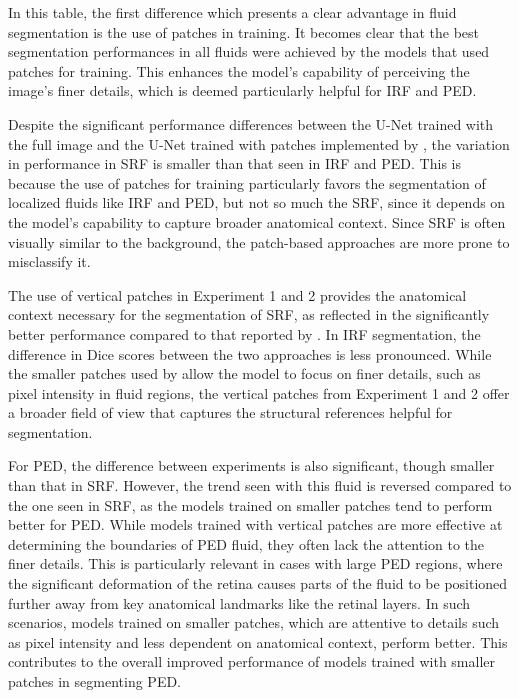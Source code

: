 In this table, the first difference which presents a clear advantage in fluid segmentation is the use of patches in training. It becomes clear that the best segmentation performances in all fluids were achieved by the models that used patches for training. This enhances the model's capability of perceiving the image's finer details, which is deemed particularly helpful for IRF and PED.
\par
Despite the significant performance differences between the U-Net trained with the full image and the U-Net trained with patches implemented by \textcite{Alsaih2020}, the variation in performance in SRF is smaller than that seen in IRF and PED. This is because the use of patches for training particularly favors the segmentation of localized fluids like IRF and PED, but not so much the SRF, since it depends on the model's capability to capture broader anatomical context. Since SRF is often visually similar to the background, the patch-based approaches are more prone to misclassify it.
\par 
The use of vertical patches in Experiment 1 and 2 provides the anatomical context necessary for the segmentation of SRF, as reflected in the significantly better performance compared to that reported by \textcite{Alsaih2020}. In IRF segmentation, the difference in Dice scores between the two approaches is less pronounced. While the smaller patches used by \textcite{Alsaih2020} allow the model to focus on finer details, such as pixel intensity in fluid regions, the vertical patches from Experiment 1 and 2 offer a broader field of view that captures the structural references helpful for segmentation.
\par
For PED, the difference between experiments is also significant, though smaller than that in SRF. However, the trend seen with this fluid is reversed compared to the one seen in SRF, as the models trained on smaller patches tend to perform better for PED. While models trained with vertical patches are more effective at determining the boundaries of PED fluid, they often lack the attention to the finer details. This is particularly relevant in cases with large PED regions, where the significant deformation of the retina causes parts of the fluid to be positioned further away from key anatomical landmarks like the retinal layers. In such scenarios, models trained on smaller patches, which are attentive to details such as pixel intensity and less dependent on anatomical context, perform better. This contributes to the overall improved performance of models trained with smaller patches in segmenting PED.
